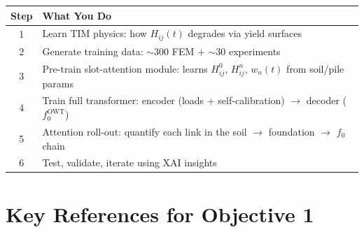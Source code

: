 \documentclass[11pt,a4paper]{article}
\begin{document}
\begin{center}
\begin{tabular}{cp{10cm}}
\toprule
\textbf{Step} & \textbf{What You Do} \\
\midrule
1 & Learn TIM physics: how $H_{ij}(t)$ degrades via yield surfaces \\
2 & Generate training data: $\sim$300 FEM + $\sim$30 experiments \\
3 & Pre-train slot-attention module: learns $H^0_{ij}$, $H^n_{ij}$, $w_n(t)$ from soil/pile params \\
4 & Train full transformer: encoder (loads + self-calibration) $\to$ decoder ($f_0^{\text{OWT}}$) \\
5 & Attention roll-out: quantify each link in the soil $\to$ foundation $\to$ $f_0$ chain \\
6 & Test, validate, iterate using XAI insights \\
\bottomrule
\end{tabular}
\end{center}

\section{Key References for Objective 1}
\end{document}
